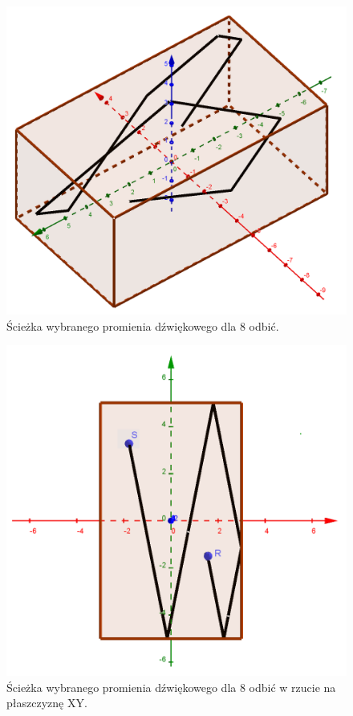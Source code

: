 \begin{figure}[h]
        \centering
                \centering
                \includegraphics[width=12cm]{odbicia}
	\caption{Ścieżka wybranego promienia dźwiękowego dla 8 odbić.}
\end{figure}

\begin{figure}[h]
        \centering
                \centering
                \includegraphics[width=12cm]{odbiciaz}
	\caption{Ścieżka wybranego promienia dźwiękowego dla 8 odbić w rzucie na płaszczyznę XY.}
\end{figure}

